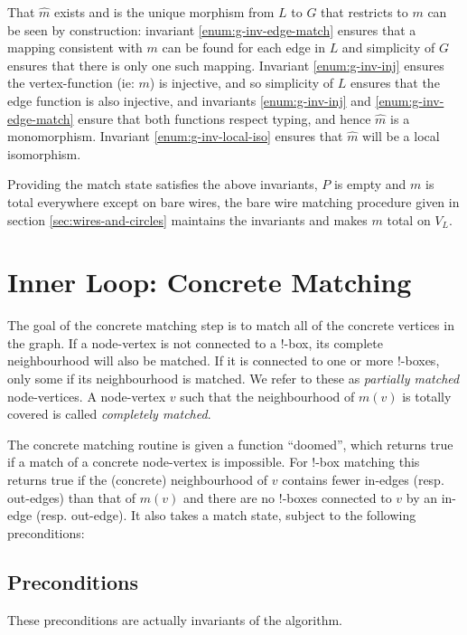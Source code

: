 \documentclass{article}
\begin{document}
That $\hat m$ exists and is the unique morphism from $L$ to $G$ that restricts to $m$ can be seen by construction: invariant \ref{enum:g-inv-edge-match} ensures that a mapping consistent with $m$ can be found for each edge in $L$ and simplicity of $G$ ensures that there is only one such mapping.  Invariant \ref{enum:g-inv-inj} ensures the vertex-function (ie: $m$) is injective, and so simplicity of $L$ ensures that the edge function is also injective, and invariants \ref{enum:g-inv-inj} and \ref{enum:g-inv-edge-match} ensure that both functions respect typing, and hence $\hat m$ is a monomorphism.  Invariant \ref{enum:g-inv-local-iso} ensures that $\hat m$ will be a local isomorphism.

Providing the match state satisfies the above invariants, $P$ is empty and $m$ is total everywhere except on bare wires, the bare wire matching procedure given in section \ref{sec:wires-and-circles} maintains the invariants and makes $m$ total on $V_L$.


\section{Inner Loop: Concrete Matching}
\label{sec:inner-loop}

The goal of the concrete matching step is to match all of the concrete vertices in the graph. If a node-vertex is not connected to a !-box, its complete neighbourhood will also be matched. If it is connected to one or more !-boxes, only some if its neighbourhood is matched. We refer to these as \textit{partially matched} node-vertices. A node-vertex $v$ such that the neighbourhood of $m(v)$ is totally covered is called \textit{completely matched}.

The concrete matching routine is given a function ``doomed'', which returns true if a match of a concrete node-vertex is impossible. For !-box matching this returns true if the (concrete) neighbourhood of $v$ contains fewer in-edges (resp. out-edges) than that of $m(v)$ and there are no !-boxes connected to $v$ by an in-edge (resp. out-edge). It also takes a match state, subject to the following preconditions:

\subsection{Preconditions}
\label{sec:il-precond}

These preconditions are actually invariants of the algorithm.
\end{document}
